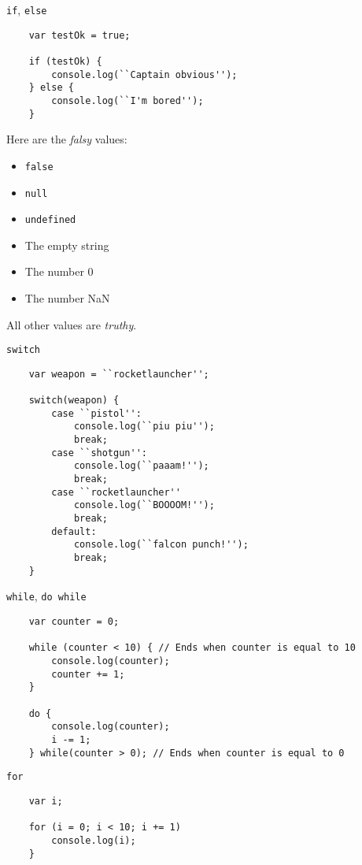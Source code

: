 \begin{frame}[fragile]
  \begin{block}{\texttt{if}, \texttt{else}}
    \scriptsize{
    \begin{verbatim}
    var testOk = true;

    if (testOk) {
        console.log(``Captain obvious'');
    } else {
        console.log(``I'm bored'');
    }
    \end{verbatim}
    }
    Here are the \textit{falsy} values:
    \begin{itemize}
      \item \texttt{false}
      \item \texttt{null}
      \item \texttt{undefined}
      \item The empty string
      \item The number 0
      \item The number NaN
    \end{itemize}
    All other values are \textit{truthy}.
  \end{block}
\end{frame}

\begin{frame}[fragile]
  \begin{block}{\texttt{switch}}
    \scriptsize{
    \begin{verbatim}
    var weapon = ``rocketlauncher'';

    switch(weapon) {
        case ``pistol'':
            console.log(``piu piu'');
            break;
        case ``shotgun'':
            console.log(``paaam!'');
            break;
        case ``rocketlauncher''
            console.log(``BOOOOM!'');
            break;
        default:
            console.log(``falcon punch!'');
            break;
    }
    \end{verbatim}
    }
  \end{block}
\end{frame}

\begin{frame}[fragile]
  \begin{block}{\texttt{while}, \texttt{do while}}
    \scriptsize{
    \begin{verbatim}
    var counter = 0;

    while (counter < 10) { // Ends when counter is equal to 10
        console.log(counter);
        counter += 1;
    }

    do {
        console.log(counter);
        i -= 1;
    } while(counter > 0); // Ends when counter is equal to 0
    \end{verbatim}
    }
  \end{block}

  \begin{block}{\texttt{for}}
    \scriptsize{
    \begin{verbatim}
    var i;

    for (i = 0; i < 10; i += 1)
        console.log(i);
    }
    \end{verbatim}
    }
  \end{block}
\end{frame}

